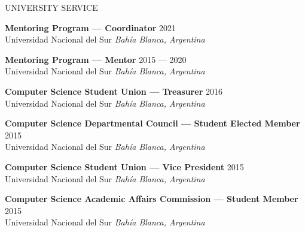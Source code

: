 \documentclass{resume} %
\begin{document}

\newpage
\begin{rSection}{UNIVERSITY SERVICE}

\item \textbf{Mentoring Program --- Coordinator} \hfill  2021\\
Universidad Nacional del Sur \hfill \textit{Bahía Blanca, Argentina}

\item \textbf{Mentoring Program --- Mentor} \hfill  2015 --- 2020\\
Universidad Nacional del Sur \hfill \textit{Bahía Blanca, Argentina}

\item \textbf{Computer Science Student Union --- Treasurer} \hfill  2016\\
Universidad Nacional del Sur \hfill \textit{Bahía Blanca, Argentina}

\item \textbf{Computer Science Departmental Council --- Student Elected Member} \hfill  2015\\
Universidad Nacional del Sur \hfill \textit{Bahía Blanca, Argentina}

\item \textbf{Computer Science Student Union --- Vice President} \hfill  2015\\
Universidad Nacional del Sur \hfill \textit{Bahía Blanca, Argentina}

\item \textbf{Computer Science Academic Affairs Commission --- Student Member} \hfill  2015\\
Universidad Nacional del Sur \hfill \textit{Bahía Blanca, Argentina}

\end{rSection}
\end{document}
